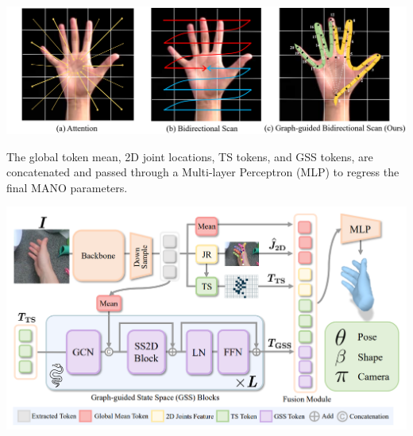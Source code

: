 \documentclass{article}
\begin{document}
\begin{center}
    \includegraphics[scale=0.25]{hamba-3.png}
\end{center}

The global token mean, 2D joint locations, TS tokens, and GSS tokens, are concatenated and passed through a Multi-layer Perceptron (MLP) to regress the final MANO parameters.

\begin{center}
    \includegraphics[scale=0.35]{hamba-1.png}
\end{center}

\pagebreak
\end{document}
